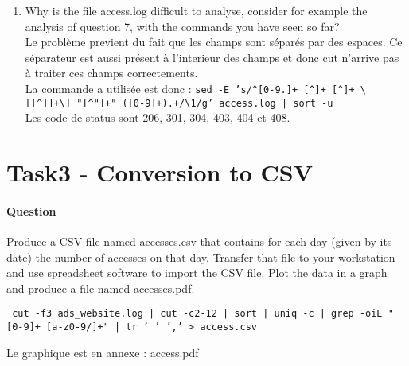 \documentclass[a4paper,11pt]{article}
\newcounter{commande}[subsection]
\newcommand{\question}[1]{\addtocounter{commande}{1}

\paragraph{Question \arabic{commande}}#1\;}
\begin{document}
\begin{enumerate}
        \item Why is the file access.log difficult to analyse, consider for example the analysis of question 7, with the commands you have seen so far?  \\
        Le problème previent du fait que les champs sont séparés par des espaces. Ce séparateur est aussi présent à l'interieur des champs et donc cut n'arrive pas à traiter ces champs correctements. \\
        La commande a utilisée est donc :
        \texttt{sed -E 's/\textasciicircum[0-9.]+ [\textasciicircum ]+ [\textasciicircum ]+ \textbackslash[[\textasciicircum]]+\textbackslash] "[\textasciicircum"]+" ([0-9]+).+/\textbackslash1/g' access.log | sort -u}\\
        Les code de status sont 206, 301, 304, 403, 404 et 408.


    \end{enumerate}


    \section{Task3 - Conversion to CSV}
    \question{Produce a CSV file named accesses.csv that contains for each day (given by its date) the number of accesses on that day. Transfer that file to your workstation and use spreadsheet software to import the CSV file. Plot the data in a graph and produce a file named accesses.pdf.}

    \texttt{ cut -f3 ads\_website.log | cut -c2-12 | sort | uniq -c | grep -oiE "[0-9]+ [a-z0-9/]+" | tr ' ' ',' > access.csv}

    Le graphique est en annexe : access.pdf
\end{document}
